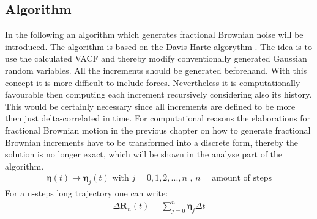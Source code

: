 \documentclass[
  a4paper,BCOR10mm,oneside,
  bibtotoc,idxtotoc,
  headsepline,footsepline,%
  fleqn,openbib
]{scrbook}
\begin{document}
\subsection{Algorithm}
In the following an algorithm which generates fractional Brownian noise will be introduced. The algorithm is based on the Davis-Harte algorythm \cite{Craigmile2003}. The idea is to use the calculated VACF and thereby modify conventionally generated Gaussian random variables.  All the increments should be generated beforehand. With this concept it is more difficult to include forces. Nevertheless it is computationally favourable then computing each increment recursively considering also its history. This would be certainly necessary since all increments are defined to be more then just delta-correlated in time. For computational reasons the elaborations for fractional Brownian motion in the previous chapter on how to generate fractional Brownian increments have to be transformed into a discrete form, thereby the solution is no longer exact, which will be shown in the analyse part of the algorithm.   
\begin{align}
\bm{\eta} (t) \longrightarrow \bm{\eta}_j(t)  \text{  with  } j=0,1,2,...,n  \text{  ,  } n= \text{amount of steps}
\end{align}
For a n-steps long trajectory one can write:
\begin{align}
 \Delta \bm{R}_n(t) =  \sum_{j=0}^n \bm{\eta}_j  \Delta t \label{eq:diskretdeltar}
\end{align}
\end{document}
